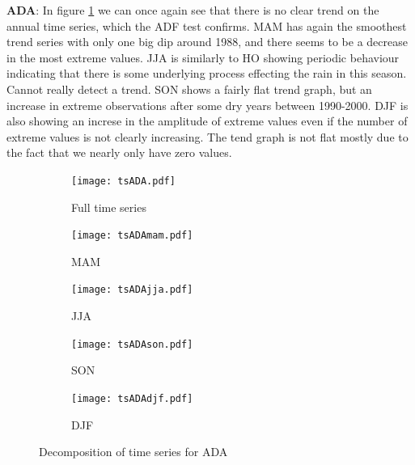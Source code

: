 \documentclass{article}
\begin{document}
	{\Large\textbf{ADA}}: In figure \ref{tsADA} we can once again see that there is no clear trend on the annual time series, which the ADF test confirms. MAM has again the smoothest trend series with only one big dip around 1988, and there seems to be a decrease in the most extreme values. JJA is similarly to HO showing periodic behaviour indicating that there is some underlying process effecting the rain in this season. Cannot really detect a trend. SON shows a fairly flat trend graph, but an increase in extreme observations after some dry years between 1990-2000. DJF is also showing an increse in the amplitude of extreme values even if the number of extreme values is not clearly increasing. The tend graph is not flat mostly due to the fact that we nearly only have zero values.
	\begin{figure}[H]
		\centering
		\begin{subfigure}{0.6\textwidth}
			\centering
			\texttt{[image: tsADA.pdf]}
			\caption{Full time series}
		\end{subfigure}
		\begin{subfigure}{0.5\textwidth}
			\centering
			\texttt{[image: tsADAmam.pdf]}
			\caption{MAM}
		\end{subfigure}%
		\begin{subfigure}{0.5\textwidth}
			\centering
			\texttt{[image: tsADAjja.pdf]}
			\caption{JJA}
		\end{subfigure}
		\begin{subfigure}{0.5\textwidth}
			\centering
			\texttt{[image: tsADAson.pdf]}
			\caption{SON}
		\end{subfigure}%
		\begin{subfigure}{0.5\textwidth}
			\centering
			\texttt{[image: tsADAdjf.pdf]}
			\caption{DJF}
		\end{subfigure}%
		\caption{Decomposition of time series for ADA}
		\label{tsADA}
	\end{figure}
\end{document}

